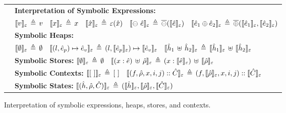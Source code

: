 \begin{figure}[t!]
{\small
\begin{tabular}{l}
$\quad${\bf Interpretation of Symbolic Expressions:}  \\
$
\quad
\llbracket v \rrbracket_{\varepsilon} \,\triangleq\, v
\quad 
\llbracket x \rrbracket_{\varepsilon} \,\triangleq\, x
\quad 
\llbracket \hat{x} \rrbracket_{\varepsilon} \,\triangleq\, \varepsilon(\hat{x})
\quad 
\llbracket \ominus\ \hat{e} \rrbracket_{\varepsilon} \,\triangleq\, \overline{\ominus} (\llbracket \hat{e} \rrbracket_{\varepsilon})
\quad 
\llbracket \hat{e}_1 \oplus \hat{e}_2 \rrbracket_{\varepsilon} \,\triangleq\, \overline{\oplus}(\llbracket \hat{e}_1 \rrbracket_{\varepsilon}, \llbracket \hat{e}_2 \rrbracket_{\varepsilon}) 
$
\\[3pt]
$\quad${\bf Symbolic Heaps:}  \\
$
\quad
 \llbracket \emptyset \rrbracket_{\varepsilon} \,\triangleq\, \emptyset
\quad
\llbracket (l, \hat{e}_p) \mapsto \hat{e}_v \rrbracket_{\varepsilon} \,\triangleq\,  (l, \llbracket \hat{e}_p \rrbracket_{\varepsilon}) \mapsto \llbracket \hat{e}_v \rrbracket_{\varepsilon}
\quad
\llbracket \hat{h}_1 \, \uplus \, \hat{h}_2 \rrbracket_{\varepsilon} \,\triangleq\,  \llbracket \hat{h}_1 \rrbracket_{\varepsilon} \, \uplus \, \llbracket \hat{h}_2 \rrbracket_{\varepsilon}
$%
\\[3pt]
$\quad${\bf Symbolic Stores:}  
$
 \llbracket \emptyset \rrbracket_{\varepsilon} \,\triangleq\, \emptyset
\quad 
 \llbracket (x: \hat{e}) \, \uplus \, \hat\rho \rrbracket_{\varepsilon} \,\triangleq\, (x: \llbracket \hat{e} \rrbracket_{\varepsilon}) \, \uplus \, \llbracket \hat\rho \rrbracket_{\varepsilon}
$%
\\[3pt]
$\quad${\bf Symbolic Contexts:}  
$ \llbracket [ \ ] \rrbracket_{\varepsilon} \,\triangleq\, [ \ ]
\quad 
 \llbracket (f, \hat\rho, x, i, j) :: \hat{C} \rrbracket_{\varepsilon} \,\triangleq\, (f, \llbracket \hat\rho \rrbracket_{\varepsilon}, x, i, j) :: \llbracket \hat{C} \rrbracket_{\varepsilon}
$%

\\[3pt]
$\quad${\bf Symbolic States:}  $\llbracket (\hat{h}, \hat\rho, \hat{C}) \rrbracket_{\varepsilon} \,\triangleq\, (\llbracket \hat{h} \rrbracket_{\varepsilon}, \llbracket \hat\rho \rrbracket_{\varepsilon}, \llbracket \hat{C} \rrbracket_{\varepsilon})$
\end{tabular}
}
\caption{Interpretation of symbolic expressions, heaps, stores, and contexts.\label{fig:symbolic:interp}}
\vspace{-0.5cm}
\end{figure}

